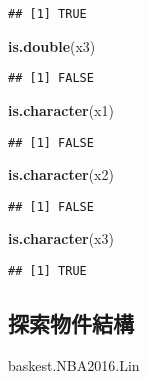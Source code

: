 \documentclass[]{article}
\newenvironment{Shaded}{\begin{snugshade}}{\end{snugshade}}
\newcommand{\KeywordTok}[1]{\textcolor[rgb]{0.13,0.29,0.53}{\textbf{#1}}}
\newcommand{\NormalTok}[1]{#1}
\begin{document}
\begin{verbatim}
## [1] TRUE
\end{verbatim}

\begin{Shaded}
\begin{Highlighting}[]
\KeywordTok{is.double}\NormalTok{(x3) }
\end{Highlighting}
\end{Shaded}

\begin{verbatim}
## [1] FALSE
\end{verbatim}

\begin{Shaded}
\begin{Highlighting}[]
\KeywordTok{is.character}\NormalTok{(x1)}
\end{Highlighting}
\end{Shaded}

\begin{verbatim}
## [1] FALSE
\end{verbatim}

\begin{Shaded}
\begin{Highlighting}[]
\KeywordTok{is.character}\NormalTok{(x2)}
\end{Highlighting}
\end{Shaded}

\begin{verbatim}
## [1] FALSE
\end{verbatim}

\begin{Shaded}
\begin{Highlighting}[]
\KeywordTok{is.character}\NormalTok{(x3)}
\end{Highlighting}
\end{Shaded}

\begin{verbatim}
## [1] TRUE
\end{verbatim}

\hypertarget{ux63a2ux7d22ux7269ux4ef6ux7d50ux69cb}{%
\subsection{探索物件結構}\label{ux63a2ux7d22ux7269ux4ef6ux7d50ux69cb}}

\begin{Shaded}
\begin{Highlighting}[]
\NormalTok{baskest.NBA2016.Lin}
\end{Highlighting}
\end{Shaded}
\end{document}
